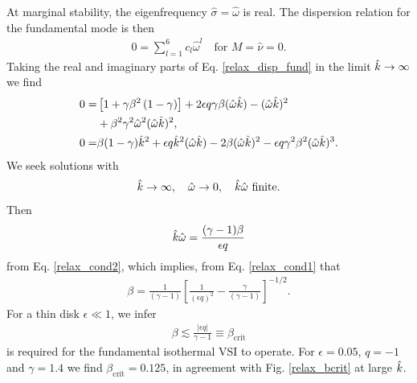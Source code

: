 At marginal stability, the eigenfrequency $\hat{\sigma}=\hat{\omega}$
is real. The dispersion relation for the fundamental mode is then
\begin{align}\label{relax_disp_fund}
  0 = \sum_{l=1}^{6}c_l\hat{\omega}^l \quad \text{for $M=\hat{\nu}=0$}.  
\end{align} 
Taking the real and imaginary parts of Eq. \ref{relax_disp_fund} in
the limit $\hat{k}\to\infty$ we find
\begin{align}
  0 =& \left[1 + \gamma\beta^2\left(1-\gamma\right)\right] + 2\epsilon q
  \gamma\beta (\hat{\omega}\hat{k}) -  (\hat{\omega}\hat{k})^2 \notag\\
  &+ \beta^2\gamma^2\hat{\omega}^2 (\hat{\omega}\hat{k})^2,\label{relax_cond1}\\
  0=& \beta(1-\gamma)\hat{k}^2 + \epsilon q \hat{k}^2 (\hat{\omega}\hat{k})
  - 2\beta (\hat{\omega}\hat{k})^2 - \epsilon q \gamma^2\beta^2 (\hat{\omega}\hat{k})^3.\label{relax_cond2}
\end{align}
We seek solutions with
\begin{align}
  \hat{k} \to \infty, \quad \hat{\omega}\to 0 ,\quad \hat{k}\hat{\omega} \text{ finite}.
\end{align}
Then
\begin{align}
  \hat{k}\hat{\omega} = \frac{(\gamma-1)\beta}{\epsilon q}
\end{align}
from Eq. \ref{relax_cond2}, which implies, from Eq. \ref{relax_cond1}
that
\begin{align}
  \beta = \frac{1}{(\gamma-1)}\left[\frac{1}{\left(\epsilon
        q\right)^2} - \frac{\gamma}{(\gamma-1)}\right]^{-1/2}. 
\end{align}
For a thin disk $\epsilon\ll 1$, we infer 
\begin{align}
  \beta \lesssim \frac{|\epsilon q|}{\gamma-1} \equiv
  \beta_\mathrm{crit} 
\end{align}
is required for the fundamental isothermal VSI to operate.  For
$\epsilon = 0.05$, $q=-1$ and $\gamma=1.4$ we find
$\beta_\mathrm{crit}=0.125$, in agreement with Fig. \ref{relax_bcrit}
at large $\hat{k}$. 

